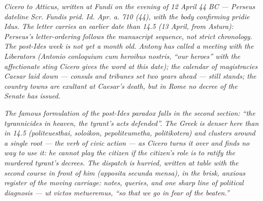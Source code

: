 
\textit{Cicero to Atticus, written at Fundi on the evening of 12
April 44 BC --- Perseus dateline \textit{Scr. Fundis prid. Id.
Apr. a. 710 (44)}, with the body confirming \textit{pridie
Idus}. The letter carries an earlier date than 14.5 (13 April,
from Astura): Perseus's letter-ordering follows the manuscript
sequence, not strict chronology. The post-Ides week is not yet
a month old. Antony has called a meeting with the Liberators
(\textit{Antonio conloquium cum heroibus nostris}, ``our heroes''
with the affectionate sting Cicero gives the word at this date);
the calendar of magistracies Caesar laid down --- consuls and
tribunes set two years ahead --- still stands; the country towns
are exultant at Caesar's death, but in Rome no decree of the
Senate has issued.}

\textit{The famous formulation of the post-Ides paradox falls in
the second section: ``the tyrannicides in heaven, the tyrant's
acts defended''. The Greek is denser here than in 14.5
(\textit{politeuesthai}, \textit{soloikon},
\textit{pepoliteumetha}, \textit{politikotera}) and clusters
around a single root --- the verb of civic action --- as Cicero
turns it over and finds no way to use it: he cannot play the
citizen if the citizen's role is to ratify the murdered
tyrant's decrees. The dispatch is hurried, written at table
with the second course in front of him (\textit{apposita secunda
mensa}), in the brisk, anxious register of the moving carriage:
notes, queries, and one sharp line of political diagnosis ---
\textit{ut victos metueremus}, ``so that we go in fear of the
beaten.''}

